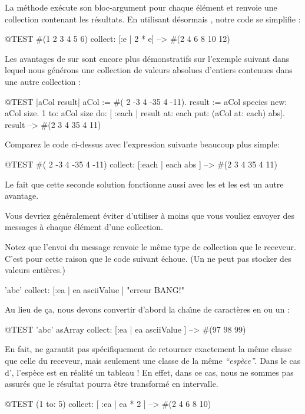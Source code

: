 \documentclass[a4paper,10pt,twoside]{book}
\begin{document}
\noindent
La m\'ethode  ex\'ecute son bloc-argument
pour chaque \'el\'ement et renvoie une collection contenant les r\'esultats.
En utilisant d\'esormais , notre code se simplifie :
\begin{code}{@TEST}
#(1 2 3 4 5 6) collect: [:e | 2 * e] --> #(2 4 6 8 10 12)
\end{code}

Les avantages de  sur  sont encore
plus d\'emonstratifs sur l'exemple suivant dans lequel nous g\'en\'erons
une collection de valeurs absolues d'entiers contenues dans une autre
collection :

\begin{code}{@TEST |aCol result|}
aCol :=  #( 2 -3 4 -35 4 -11).
result := aCol species new: aCol size.
1 to: aCol size do: [ :each | result at: each put: (aCol at: each) abs].
result --> #(2 3 4 35 4 11)
\end{code}
\noindent
Comparez le code ci-dessus avec l'expression suivante beaucoup plus simple:
\begin{code}{@TEST}
#( 2 -3 4 -35 4 -11) collect: [:each | each abs ] --> #(2 3 4 35 4 11)
\end{code}
\noindent
Le fait que cette seconde solution fonctionne aussi avec les  et les  est un autre avantage.

Vous devriez g\'en\'eralement \'eviter d'utiliser  \`a moins que 
vous vouliez envoyer des messages \`a chaque \'el\'ement d'une collection.

Notez que l'envoi du message  renvoie le m\^eme type de collection
que le receveur.
C'est pour cette raison que le code suivant \'echoue.
(Un  ne peut pas stocker des valeurs enti\`eres.)
\begin{code}{}
'abc' collect: [:ea | ea asciiValue ]      "erreur BANG!"
\end{code}
\noindent
Au lieu de \c{c}a, nous devons convertir d'abord la cha\^{\i}ne de caract\`eres
en  ou un :
\begin{code}{@TEST}
'abc' asArray collect: [:ea | ea asciiValue ] --> #(97 98 99)
\end{code}

En fait,  ne garantit pas sp\'ecifiquement de retourner 
exactement la m\^eme classe que celle du receveur, mais seulement une classe
de la m\^eme \emph{``esp\`ece''}.  Dans le cas d', l'esp\`ece est en r\'ealit\'e un tableau !
En effet, dans ce cas, nous ne sommes pas assurés que le résultat pourra être transformé en intervalle.
\begin{code}{@TEST}
(1 to: 5) collect: [ :ea | ea * 2 ] --> #(2 4 6 8 10)
\end{code}
\end{document}
